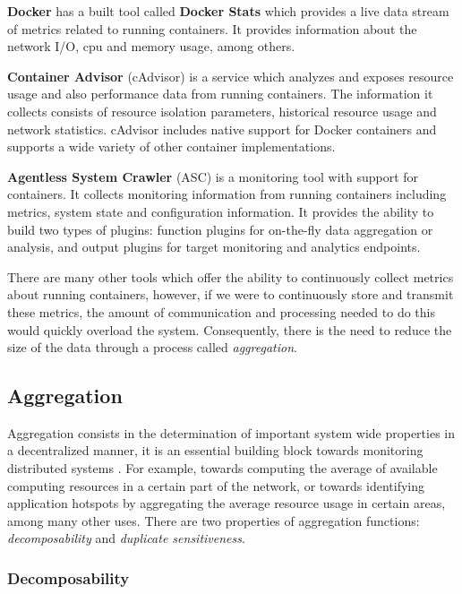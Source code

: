 \textbf{Docker} \cite{docker} has a built tool called \textbf{Docker Stats} \cite{docker_stats} which provides a live data stream of metrics related to running containers. It provides information about the network I/O, cpu and memory usage, among others. 

\textbf{Container Advisor} \cite{cAdvisor} (cAdvisor) is a service which analyzes and exposes resource usage and also performance data from running containers. The information it collects consists of resource isolation parameters, historical resource usage and network statistics. cAdvisor includes native support for Docker containers and supports a wide variety of other container implementations.

\textbf{Agentless System Crawler}  (ASC) \cite{cloudviz_2019} is a monitoring tool with support for containers. It collects monitoring information from running containers including metrics, system state and configuration information. It provides the ability to build two types of plugins: function  plugins for on-the-fly data aggregation or analysis, and output plugins for target monitoring and analytics endpoints.

There are many other tools which offer the ability to continuously collect metrics about running containers, however, if we were to continuously store and transmit these metrics, the amount of communication and processing needed to do this would quickly overload the system. Consequently, there is the need to reduce the size of the data through a process called \textit{aggregation}.

\subsection{Aggregation}

Aggregation consists in the determination of important system wide properties in a decentralized manner, it is an essential building block towards monitoring distributed systems \cite{8613952} \cite{DBLP:journals/corr/abs-1110-0725}. For example, towards computing the average of available computing resources in a certain part of the network, or towards identifying application hotspots by aggregating the average resource usage in certain areas, among many other uses. There are two properties of aggregation functions: \textit{decomposability} and \textit{duplicate sensitiveness}.

\subsubsection*{Decomposability}

